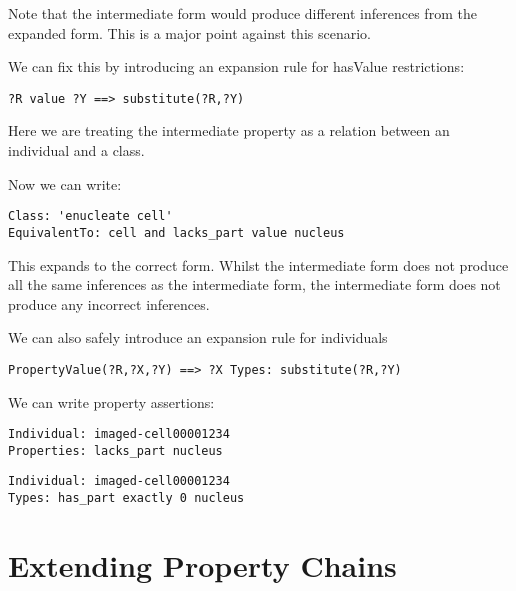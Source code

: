 \documentclass[11pt]{article}
\begin{document}

Note that the intermediate form would produce different inferences
from the expanded form. This is a major point against this scenario.

We can fix this by introducing an expansion rule for hasValue restrictions:

\begin{verbatim}
?R value ?Y ==> substitute(?R,?Y)
\end{verbatim}

Here we are treating the intermediate property as a relation between
an individual and a class.

Now we can write:

\begin{verbatim}
Class: 'enucleate cell'
EquivalentTo: cell and lacks_part value nucleus
\end{verbatim}


This expands to the correct form. Whilst the intermediate form does
not produce all the same inferences as the intermediate form, the
intermediate form does not produce any incorrect inferences.


We can also safely introduce an expansion rule for individuals


\begin{verbatim}
PropertyValue(?R,?X,?Y) ==> ?X Types: substitute(?R,?Y)
\end{verbatim}

We can write property assertions:

\begin{verbatim}
Individual: imaged-cell00001234
Properties: lacks_part nucleus
\end{verbatim}

\begin{verbatim}
Individual: imaged-cell00001234
Types: has_part exactly 0 nucleus
\end{verbatim}

\section{Extending Property Chains}
\end{document}
